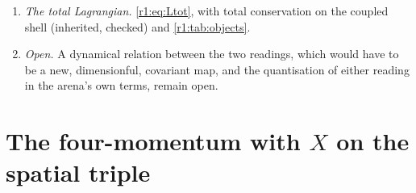 \begin{enumerate}[label=(\arabic*),leftmargin=2.2em]
Lorentz-invariant conformal Lagrangian with indefinite energy, pointwise duality invariant but not duality invariant in the sense of
Gaillard and Zumino (fixed), and it is the generator of ModMax and the
partner of $E_6$ in the ModMax Hamiltonian (fixed; the ModMax facts inherited). Reading $L_0$ as ``the rest-energy Lagrangian'' is
interpretive, and as the Lagrangian of a positive-energy theory it is obstructed.
\item \emph{The total Lagrangian.} \eqref{r1:eq:Ltot}, with total conservation on the coupled shell (inherited, checked) and
\cref{r1:tab:objects}.
\item \emph{Open.} A dynamical relation between the two readings, which would have to be a new, dimensionful, covariant map, and the
quantisation of either reading in the arena's own terms, remain open.
\end{enumerate}


\section{\texorpdfstring{The four-momentum with $X$ on the spatial triple}{The four-momentum with X on the spatial triple}}
\label{r2:sec:main}

